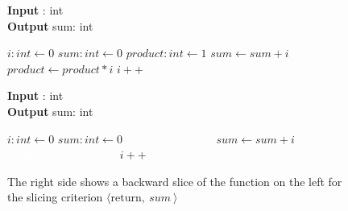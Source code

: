 \begin{figure}
    \centering
    \begin{minipage}{.4\textwidth}
        \begin{algorithm}[H]
            \hspace*{\algorithmicindent} \textbf{Input} \In: int \\
            \hspace*{\algorithmicindent} \textbf{Output} sum: int \\
            \hspace*{.5em}
            \begin{algorithmic}
                \State $i: int \leftarrow 0$
                \State $sum: int \leftarrow 0$
                \State $product: int \leftarrow 1$
                    \State $sum \leftarrow sum + i$
                    \State $product \leftarrow product * i$
                    \State $i++$
                \EndWhile\\
                \Return
            \end{algorithmic}
        \end{algorithm}
    \end{minipage}
    \hfill
    \begin{minipage}{.4\textwidth}
        \begin{algorithm}[H]
            \hspace*{\algorithmicindent} \textbf{Input} \In: int \\
            \hspace*{\algorithmicindent} \textbf{Output} sum: int \\
            \hspace*{.5em}
            \begin{algorithmic}
                \State $i: int \leftarrow 0$
                \State $sum: int \leftarrow 0$
                \State $\color{white} product: int \leftarrow 1$
                    \State $sum \leftarrow sum + i$
                    \State $\color{white} product \leftarrow product * i$
                    \State $i++$
                \EndWhile\\
                \Return
            \end{algorithmic}
        \end{algorithm}
    \end{minipage}
    \caption{The right side shows a backward slice of the function on the left for the slicing criterion $\langle \text{return}, \: sum \: \rangle$}
    \label{fig:slice}

\end{figure}


